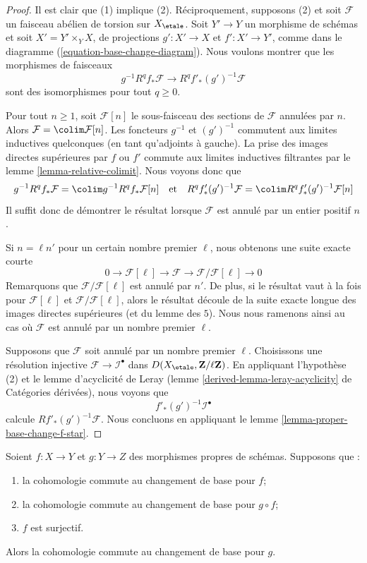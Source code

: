 \begin{proof}
Il est clair que (1) implique (2). Réciproquement, supposons (2) et soit
$\mathcal{F}$ un faisceau abélien de torsion sur $X_\etale$. Soit $Y' \to Y$
un morphisme de schémas et soit $X' = Y' \times_Y X$,
de projections $g' : X' \to X$ et $f' : X' \to Y'$, comme dans le
diagramme (\ref{equation-base-change-diagram}).
Nous voulons montrer que les morphismes de faisceaux
$$
g^{-1}R^qf_*\mathcal{F} \longrightarrow R^qf'_*(g')^{-1}\mathcal{F}
$$
sont des isomorphismes pour tout $q \geq 0$.

\medskip\noindent
Pour tout $n \geq 1$, soit $\mathcal{F}[n]$ le sous-faisceau des sections
de $\mathcal{F}$ annulées par $n$. Alors
$\mathcal{F} = \colim \mathcal{F}[n]$.
Les foncteurs $g^{-1}$ et $(g')^{-1}$ commutent aux limites inductives quelconques
(en tant qu'adjoints à gauche). La prise des images directes supérieures par $f$ ou $f'$
commute aux limites inductives filtrantes par le lemme \ref{lemma-relative-colimit}.
Nous voyons donc que
$$
g^{-1}R^qf_*\mathcal{F} = \colim g^{-1}R^qf_*\mathcal{F}[n]
\quad\text{et}\quad
R^qf'_*(g')^{-1}\mathcal{F} =
\colim R^qf'_*(g')^{-1}\mathcal{F}[n]
$$
Il suffit donc de démontrer le résultat lorsque $\mathcal{F}$ est
annulé par un entier positif $n$.

\medskip\noindent
Si $n = \ell n'$ pour un certain nombre premier $\ell$, nous obtenons une suite
exacte courte
$$
0 \to \mathcal{F}[\ell] \to \mathcal{F} \to
\mathcal{F}/\mathcal{F}[\ell] \to 0
$$
Remarquons que $\mathcal{F}/\mathcal{F}[\ell]$ est annulé par $n'$.
De plus, si le résultat vaut à la fois pour $\mathcal{F}[\ell]$ et
$\mathcal{F}/\mathcal{F}[\ell]$, alors le résultat découle de
la suite exacte longue des images directes supérieures (et du lemme des $5$).
Nous nous ramenons ainsi au cas où $\mathcal{F}$ est annulé
par un nombre premier $\ell$.

\medskip\noindent
Supposons que $\mathcal{F}$ soit annulé par un nombre premier $\ell$.
Choisissons une résolution injective $\mathcal{F} \to \mathcal{I}^\bullet$
dans $D(X_\etale, \mathbf{Z}/\ell\mathbf{Z})$. En appliquant l'hypothèse
(2) et le lemme d'acyclicité de Leray
(lemme \ref{derived-lemma-leray-acyclicity} de Catégories dérivées),
nous voyons que
$$
f'_*(g')^{-1}\mathcal{I}^\bullet
$$
calcule $Rf'_*(g')^{-1}\mathcal{F}$. Nous concluons en appliquant le
lemme \ref{lemma-proper-base-change-f-star}.
\end{proof}

\begin{lemma}
\label{lemma-sandwich}
Soient $f : X \to Y$ et $g : Y \to Z$ des morphismes propres de schémas. Supposons que :
\begin{enumerate}
\item la cohomologie commute au changement de base pour $f$;
\item la cohomologie commute au changement de base pour $g \circ f$;
\item $f$ est surjectif.
\end{enumerate}
Alors la cohomologie commute au changement de base pour $g$.
\end{lemma}

